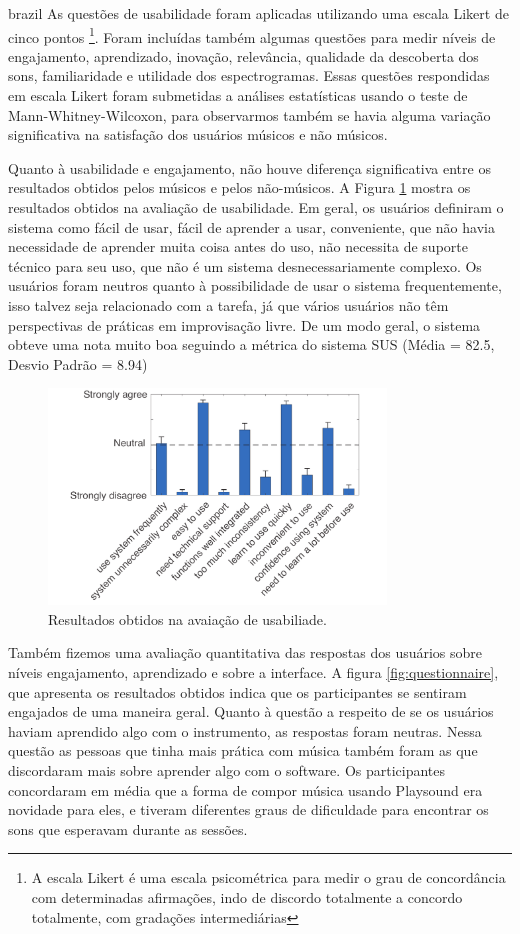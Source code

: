 \begin{otherlanguage*}{brazil}
As questões de usabilidade foram aplicadas utilizando uma escala Likert de cinco pontos \footnote{A escala Likert é uma escala psicométrica para medir o grau de concordância com determinadas afirmações, indo de discordo totalmente a concordo totalmente, com gradações intermediárias}. Foram incluídas também algumas questões para medir níveis de engajamento, aprendizado, inovação, relevância, qualidade da descoberta dos sons, familiaridade e utilidade dos espectrogramas. Essas questões respondidas em escala Likert foram submetidas a análises estatísticas usando o teste de Mann-Whitney-Wilcoxon, para observarmos também se havia alguma variação significativa na satisfação dos usuários músicos e não músicos.

Quanto à usabilidade e engajamento, não houve diferença significativa entre os resultados obtidos pelos músicos e pelos não-músicos. A Figura \ref{fig:SUS} mostra os resultados obtidos na avaliação de usabilidade. Em geral, os usuários definiram o sistema como fácil de usar, fácil de aprender a usar, conveniente, que não havia necessidade de aprender muita coisa antes do uso, não necessita de suporte técnico para seu uso, que não é um sistema desnecessariamente complexo. Os usuários foram neutros quanto à possibilidade de usar o sistema frequentemente, isso talvez seja relacionado com a tarefa, já que vários usuários não têm perspectivas de práticas em improvisação livre. De um modo geral, o sistema obteve uma nota muito boa seguindo a métrica do sistema SUS (Média = 82.5, Desvio Padrão = 8.94)

\begin{figure}
\centering
\includegraphics[width=0.8\textwidth]{pictures/cap4/SUS_lower}
\caption{\label{amas}Resultados obtidos na avaiação de usabiliade.}
\label{fig:SUS}
\end{figure}

Também fizemos uma avaliação quantitativa das respostas dos usuários sobre níveis engajamento, aprendizado e sobre a interface. A figura \ref{fig:questionnaire}, que apresenta os resultados obtidos indica que os participantes se sentiram engajados de uma maneira geral. Quanto à questão a respeito de se os usuários haviam aprendido algo com o instrumento, as respostas foram neutras. Nessa questão as pessoas que tinha mais prática com música também foram as que discordaram mais sobre aprender algo com o software. Os participantes concordaram em média que a forma de compor música usando Playsound era novidade para eles, e tiveram diferentes graus de dificuldade para encontrar os sons que esperavam durante as sessões. 


\end{otherlanguage*}
